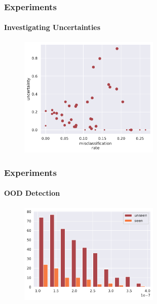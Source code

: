 \documentclass[9pt]{beamer}
\begin{document}
\begin{frame}	
\frametitle{Experiments}
\framesubtitle{Investigating Uncertainties}
	\begin{figure}
		\centering
		\includegraphics[width=0.6\textwidth]{images/error_sigma_corr_all.pdf} 
	\end{figure}
\end{frame} 



\begin{frame}
\frametitle{Experiments}
\framesubtitle{OOD Detection}
\begin{figure}
	\centering
	\includegraphics[width=0.6\textwidth]{images/zero_shot_class_uncertainty_median_hist.pdf}
\end{figure}
\end{frame} 
\end{document}
